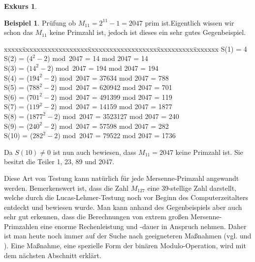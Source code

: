 \documentclass[12pt,a4paper]{article}
\theoremstyle{definition}
\newtheorem{bsp}{Beispiel}[subsection]
\newtheorem{exkurs}{Exkurs}
\begin{document}
\begin{exkurs}
\begin{bsp}{Prüfung ob $M_{11} = 2^{11} - 1 = 2047$ prim ist}.\label{bsp}\newline
Eigentlich wissen wir schon das $M_{11}$ keine Primzahl ist, jedoch ist dieses ein sehr gutes Gegenbeispiel.
\begin{tabbing}
xxxxx\=xxxxxxxxxxxxxxxxxx\=xxxxxxxxxxxxxxxxxxx\=xxxxxxxxxx\=xxxxxxx\kill
\> S(1)  = 4 \\
\> S(2)  = ($4^2 - 2$)    \> mod\ 2047 = 14      \> mod 2047 \> = 14 \\
\> S(3)  = ($14^2 - 2$)   \> mod\ 2047 = 194     \> mod 2047 \> = 194 \\
\> S(4)  = ($194^2 - 2$)  \> mod\ 2047 = 37634   \> mod 2047 \> = 788 \\
\> S(5)  = ($788^2 - 2$)  \> mod\ 2047 = 620942  \> mod 2047 \> = 701 \\
\> S(6)  = ($701^2 - 2$)  \> mod\ 2047 = 491399  \> mod 2047 \> = 119 \\
\> S(7)  = ($119^2 - 2$)  \> mod\ 2047 = 14159   \> mod 2047 \> = 1877 \\
\> S(8)  = ($1877^2 - 2$) \> mod\ 2047 = 3523127 \> mod 2047 \> = 240 \\
\> S(9)  = ($240^2 - 2$)  \> mod\ 2047 = 57598   \> mod 2047 \> = 282 \\
\> S(10) = ($282^2 - 2$)  \> mod\ 2047 = 79522   \> mod 2047 \> = 1736
\end{tabbing}
Da $S(10) \neq 0$ ist nun auch bewiesen, dass $M_{11} = 2047$ keine Primzahl ist.
Sie besitzt die Teiler 1, 23, 89 und 2047.
\end{bsp}
Diese Art von Testung kann natürlich für jede Mersenne-Primzahl angewandt werden.
Bemerkenswert ist, dass die Zahl $M_{127}$ eine 39-stellige Zahl darstellt, welche durch die Lucas-Lehmer-Testung noch vor Beginn des Computerzeitalters entdeckt und bewiesen wurde.\newline
Man kann anhand des Gegenbeispiels aber auch sehr gut erkennen, dass die Berechnungen von extrem großen Mersenne-Primzahlen eine enorme Rechenleistung und -dauer in Anspruch nehmen.
Daher ist man heute noch immer auf der Suche nach geeigneteren Maßnahmen (vgl. \cite[78--80]{Ribenboim2006} und \cite[183--184]{Crandall2005}).
Eine Maßnahme, eine spezielle Form der binären Modulo-Operation, wird mit dem nächsten Abschnitt erklärt.


\end{exkurs}
\end{document}

